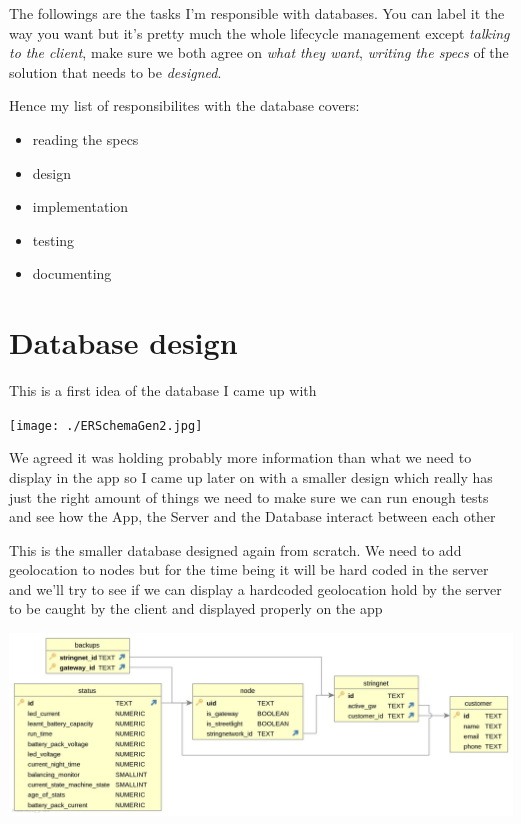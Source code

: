 \documentclass[a4paper,12pt]{book}
\begin{document}
The followings are the tasks I'm responsible with databases. You can label it the way you want but it's pretty much the whole lifecycle management except \emph{talking to the client}, make sure we both agree on \emph{what they want}, \emph{writing the specs} of the solution that needs to be \emph{designed}.

Hence my list of responsibilites with the database covers:

\begin{itemize}
\item {reading the specs}
\item design
\item implementation
\item testing 
\item documenting
\end{itemize}

\clearpage

\chapter{Database design}
This is a first idea of the database I came up with

\noindent\texttt{[image: ./ERSchemaGen2.jpg]}

We agreed it was holding probably more information than what we need to display in the app so I came up later on with a smaller design which really has just the right amount of things we need to make sure we can run enough tests and see how the App, the Server and the Database interact between each other
\clearpage

This is the smaller database designed again from scratch. We need to add geolocation to nodes but for the time being it will be hard coded in the server and we'll try to see if we can display a hardcoded geolocation hold by the server to be caught by the client and displayed properly on the app

\noindent\includegraphics[width=14cm]{./SecondERSchemaGen2.jpg}

\printindex
\end{document}
